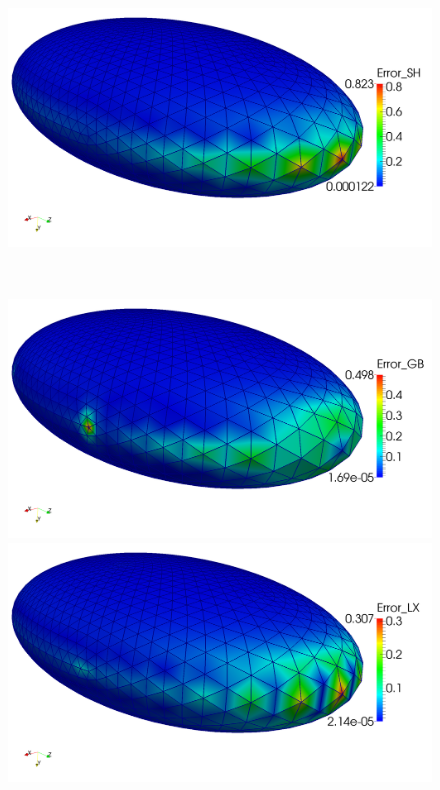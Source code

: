 \begin{figure}
\begin{minipage}[t]{0.49\textwidth}
    \end{minipage}\hfill
    \begin{minipage}[t]{0.49\textwidth}
       \centering\includegraphics[width=\textwidth]{bilder/Curvature/heineC/SH2k.png}
    \end{minipage}\\
    \begin{minipage}[t]{0.49\textwidth}
       \centering\includegraphics[width=\textwidth]{bilder/Curvature/heineC/GB2k.png}
    \end{minipage}\hfill
    \begin{minipage}[t]{0.49\textwidth}
       \centering\includegraphics[width=\textwidth]{bilder/Curvature/heineC/LX2k.png}

\end{minipage}
\end{figure}
